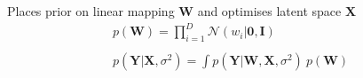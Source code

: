 \documentclass[10pt,handout]{beamer}
\begin{document}
\begin{frame}
\begin{columns}
\begin{column}[t]{0.48\textwidth}
\begin{figure}
    \end{figure}
    Places prior on linear mapping $\mathbf{W}$ and optimises latent space $\mathbf{X}$ 
    \begin{equation}
      \begin{array}{c}
        p(\mathbf{W}) = \prod_{i=1}^D \mathcal{N}(w_i|\mathbf{0},\mathbf{I})\\~\\
        p(\mathbf{Y}|\mathbf{X},\sigma^2) = \int p(\mathbf{Y}|\mathbf{W},\mathbf{X},\sigma^2)~p(\mathbf{W})
      \end{array}
    \end{equation}
  \end{column}
\end{columns}

\end{frame}
\end{document}

